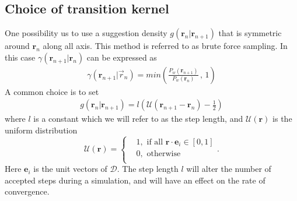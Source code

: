 \documentclass[a4paper,10pt,twocolumn]{article} %
\newcommand{\ts}[1]{\textbf{#1}}
\begin{document}

\subsection{Choice of transition kernel} %

%
One possibility us to use a suggestion density $g(\ts r_n|\ts r_{n+1})$ that is symmetric around $\ts r_n$ along all axis. 
This method is referred to as brute force sampling.
In this case $\gamma(\ts r_{n+1}|\ts r_{n})$ can be expressed as
\begin{align} 
	\gamma(\ts r_{n+1}|\vec r_n)=min\left(
	\frac
	{P_w(\ts r_{n+1})}
    {P_w(\ts r_n)}\, 
	,\, 1 \right) \label{gamma_bruteforce}
\end{align}
A common choice is to set
\begin{align}
	g(\ts r_n|\ts r_{n+1}) = l\left(\mathcal U(\ts r_{n+1}-\ts r_n) - \frac12\right)
	\label{sugdebf}
\end{align}
where $l$ is a constant which we will refer to as the step length, and $\mathcal U(\ts r)$ is the uniform distribution
\begin{equation}
	\mathcal U(\ts r) = \left\{ 
	\begin{split} 
		&1, \text{ if all } \ts r \cdot \ts e_i \in [0,1]\\
		&0, \text{ otherwise }\\
	\end{split}
	\right..
\end{equation} 
Here $\ts e_i$ is the unit vectors of $\mathcal D$. 
The step length $l$ will alter the number of 
accepted steps during a simulation, and will have an effect on the rate of convergence. %
\end{document}
